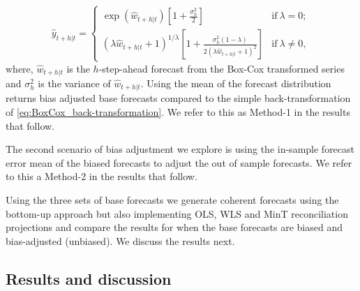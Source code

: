 \documentclass[12pt]{article}
\theoremstyle{definition}
\theoremstyle{property}
\begin{document}
\begin{equation} \label{eq:BoxCox_BT_biasadj}
	 \hat{y}_{t+h|t} =
	\begin{cases}
	\exp({\hat{w}_{t+h|t}})[1+\frac{\sigma_h^2}{2}] & \text{if}~\lambda = 0; \\
	(\lambda \hat{w}_{t+h|t} + 1)^{1/\lambda}[1 + \frac{\sigma_h^2(1-\lambda)}{2(\lambda \hat{w}_{t+h|t} + 1)^2}]       & \text{if}~\lambda \ne 0,
	\end{cases}
	\end{equation}
where, $\hat{w}_{t+h|t}$ is the $h$-step-ahead forecast from the Box-Cox transformed series and $\sigma_h^2$ is the variance of $\hat{w}_{t+h|t}$. Using the mean of the forecast distribution returns bias adjusted base forecasts compared to the simple back-transformation of \eqref{eq:BoxCox_back-transformation}. We refer to this as Method-1 in the results that follow.

The second scenario of bias adjustment we explore is using the in-sample forecast error mean of the biased forecasts to adjust the out of sample forecasts. We refer to this a Method-2 in the results that follow.
	
Using the three sets of base forecasts we generate coherent forecasts using the bottom-up approach but also implementing OLS, WLS and MinT reconciliation projections and compare the results for when the base forecasts are biased and bias-adjusted (unbiased). We discuss the results next.

\subsection{Results and discussion}


\end{document}
